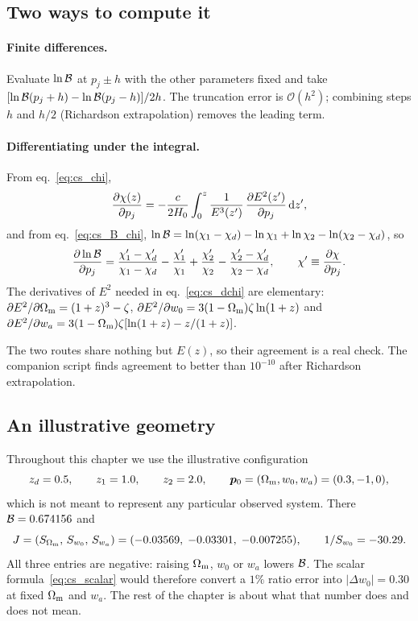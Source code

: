 \subsection{Two ways to compute it}

\paragraph{Finite differences.} Evaluate $\ln\mathcal{B}$ at $p_j\pm h$ with
the other parameters fixed and take
$[\ln\mathcal{B}(p_j+h)-\ln\mathcal{B}(p_j-h)]/2h$. The truncation error is
$\mathcal{O}(h^2)$; combining steps $h$ and $h/2$ (Richardson
extrapolation) removes the leading term.

\paragraph{Differentiating under the integral.} From
eq.~\eqref{eq:cs_chi},
\begin{equation}
  \frac{\partial \chi(z)}{\partial p_j}=-\frac{c}{2H_0}\int_0^z
  \frac{1}{E^3(z')}\,\frac{\partial E^2(z')}{\partial p_j}\,\dd z' ,
  \label{eq:cs_dchi}
\end{equation}
and from eq.~\eqref{eq:cs_B_chi},
$\ln\mathcal{B}=\ln(\chi_1-\chi_d)-\ln\chi_1+\ln\chi_2-\ln(\chi_2-\chi_d)$, so
\begin{equation}
  \frac{\partial \ln\mathcal{B}}{\partial p_j}
  =\frac{\chi_1'-\chi_d'}{\chi_1-\chi_d}-\frac{\chi_1'}{\chi_1}
   +\frac{\chi_2'}{\chi_2}-\frac{\chi_2'-\chi_d'}{\chi_2-\chi_d},
  \qquad \chi'\equiv\frac{\partial \chi}{\partial p_j}.
  \label{eq:cs_dlnB}
\end{equation}
The derivatives of $E^2$ needed in eq.~\eqref{eq:cs_dchi} are elementary:
$\partial E^2/\partial\Omega_{\mathrm{m}}=(1+z)^3-\zeta$,
$\partial E^2/\partial w_0=3(1-\Omega_{\mathrm{m}})\zeta\ln(1+z)$ and
$\partial E^2/\partial w_a=3(1-\Omega_{\mathrm{m}})\zeta[\ln(1+z)-z/(1+z)]$.

The two routes share nothing but $E(z)$, so their agreement is a real
check. The companion script finds agreement to better than $10^{-10}$
after Richardson extrapolation.

\subsection{An illustrative geometry}

Throughout this chapter we use the illustrative configuration
\[
  z_d=0.5,\qquad z_1=1.0,\qquad z_2=2.0,\qquad
  \bm{p}_0=(\Omega_{\mathrm{m}},w_0,w_a)=(0.3,-1,0),
\]
which is not meant to represent any particular observed system. There
$\mathcal{B}=0.674156$ and
\begin{equation}
  J=(S_{\Omega_{\mathrm{m}}},\,S_{w_0},\,S_{w_a})=(-0.03569,\;-0.03301,\;-0.007255),
  \qquad 1/S_{w_0}=-30.29 .
  \label{eq:cs_J_values}
\end{equation}
All three entries are negative: raising $\Omega_{\mathrm{m}}$, $w_0$ or $w_a$ lowers
$\mathcal{B}$. The scalar formula~\eqref{eq:cs_scalar} would therefore convert
a $1\%$ ratio error into $|\Delta w_0|=0.30$ at fixed $\Omega_{\mathrm{m}}$ and
$w_a$. The rest of the chapter is about what that number does and does
not mean.

